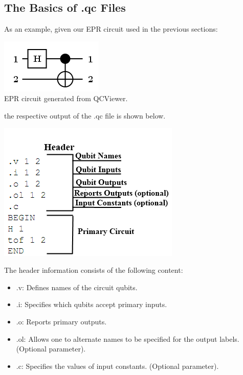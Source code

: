 \documentclass[10pt]{article}
\theoremstyle{definition}
\begin{document}
\subsection{The Basics of .qc Files}\label{sec:BasicsOfQCFiles}

As an example, given our EPR circuit used in the previous sections:

\begin{center}
\includegraphics[scale=.7]{Figures/QCFiles/EPRCircuit} \\
EPR circuit generated from QCViewer.
\end{center}

the respective output of the .qc file is shown below.

\begin{center}
\includegraphics{Figures/QCFiles/EPRQCFile.png}
\end{center}

The header information consists of the following content:

\begin{itemize}
\item .v: Defines names of the circuit qubits.
\item .i: Specifies which qubits accept primary inputs.
\item .o: Reports primary outputs.
\item .ol: Allows one to alternate names to be specified for the output labels. (Optional parameter).
\item .c: Specifies the values of input constants. (Optional parameter).
\end{itemize}
\end{document}
